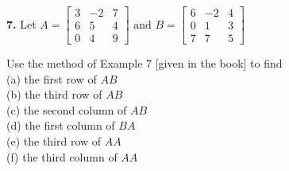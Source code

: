 \documentclass[addpoints]{exam}
\begin{document}
\begin{sloppypar}
\begin{questions}
    \question
        


    \question
    \textbf{7. } Let \newline\newline
    $A = \begin{bmatrix}
        3 & -2 & 7 \\ 
        6 & 5 & 4 \\ 
        0 & 4 & 9
    \end{bmatrix} \text{ and } 
    B = \begin{bmatrix}
        6 & -2 & 4 \\ 
        0 & 1 & 3 \\ 
        7 & 7 & 5
    \end{bmatrix}$  

    Use the method of Example 7 [given in the book] to find \\ 
    (a) the first row of $AB$ \\ 
    (b) the third row of $AB$ \\ 
    (c) the second column of $AB$ \\ 
    (d) the first column of $BA$ \\ 
    (e) the third row of $AA$ \\ 
    (f) the third column of $AA$ 
    \begin{solution}
        

\end{solution}
\end{questions}
\end{sloppypar}
\end{document}
